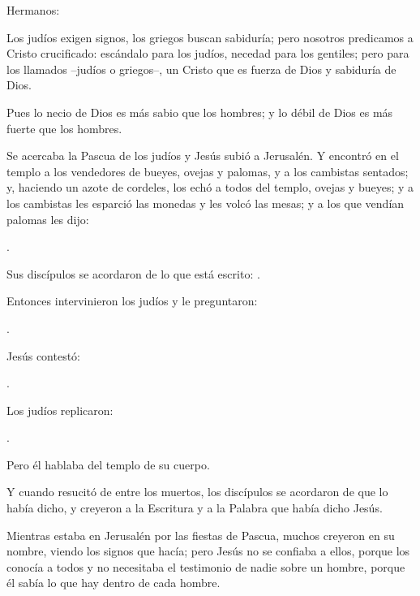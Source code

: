  


\begin{scripture}
Hermanos:

Los judíos exigen signos, los griegos buscan sabiduría; pero nosotros predicamos a Cristo crucificado: escándalo para los judíos, necedad para los gentiles; pero para los llamados –judíos o griegos–, un Cristo que es fuerza de Dios y sabiduría de Dios.

Pues lo necio de Dios es más sabio que los hombres; y lo débil de Dios es más fuerte que los hombres.
\end{scripture}

\newpage
{}

 


\begin{scripture}
Se acercaba la Pascua de los judíos y Jesús subió a Jerusalén. Y encontró en el templo a los vendedores de bueyes, ovejas y palomas, y a los cambistas sentados; y, haciendo un azote de cordeles, los echó a todos del templo, ovejas y bueyes; y a los cambistas les esparció las monedas y les volcó las mesas; y a los que vendían palomas les dijo:

.


Sus discípulos se acordaron de lo que está escrito: .

Entonces intervinieron los judíos y le preguntaron:

.

Jesús contestó:

.

Los judíos replicaron:

.

Pero él hablaba del templo de su cuerpo.

Y cuando resucitó de entre los muertos, los discípulos se acordaron de que lo había dicho, y creyeron a la Escritura y a la Palabra que había dicho Jesús.

Mientras estaba en Jerusalén por las fiestas de Pascua, muchos creyeron en su nombre, viendo los signos que hacía; pero Jesús no se confiaba a ellos, porque los conocía a todos y no necesitaba el testimonio de nadie sobre un hombre, porque él sabía lo que hay dentro de cada hombre.
\end{scripture}

